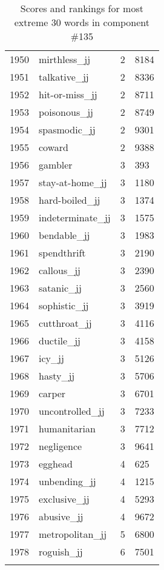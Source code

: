 \begin{longtable}[!htbp]{| rlr@{.}l |}
    1950 & mirthless\_jj & 2 & 8184 \\
    1951 & talkative\_jj & 2 & 8336 \\
    1952 & hit-or-miss\_jj & 2 & 8711 \\
    1953 & poisonous\_jj & 2 & 8749 \\
    1954 & spasmodic\_jj & 2 & 9301 \\
    1955 & coward & 2 & 9388 \\
    1956 & gambler & 3 & 393 \\
    1957 & stay-at-home\_jj & 3 & 1180 \\
    1958 & hard-boiled\_jj & 3 & 1374 \\
    1959 & indeterminate\_jj & 3 & 1575 \\
    1960 & bendable\_jj & 3 & 1983 \\
    1961 & spendthrift & 3 & 2190 \\
    1962 & callous\_jj & 3 & 2390 \\
    1963 & satanic\_jj & 3 & 2560 \\
    1964 & sophistic\_jj & 3 & 3919 \\
    1965 & cutthroat\_jj & 3 & 4116 \\
    1966 & ductile\_jj & 3 & 4158 \\
    1967 & icy\_jj & 3 & 5126 \\
    1968 & hasty\_jj & 3 & 5706 \\
    1969 & carper & 3 & 6701 \\
    1970 & uncontrolled\_jj & 3 & 7233 \\
    1971 & humanitarian & 3 & 7712 \\
    1972 & negligence & 3 & 9641 \\
    1973 & egghead & 4 & 625 \\
    1974 & unbending\_jj & 4 & 1215 \\
    1975 & exclusive\_jj & 4 & 5293 \\
    1976 & abusive\_jj & 4 & 9672 \\
    1977 & metropolitan\_jj & 5 & 6800 \\
    1978 & roguish\_jj & 6 & 7501 \\
    \hline
    \caption{Scores and rankings for most extreme 30 words in component \#135} \\
\end{longtable}
